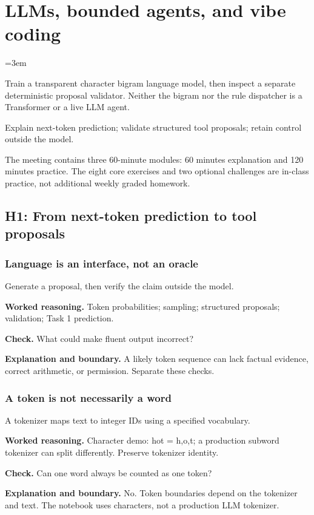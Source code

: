 \chapter{LLMs, bounded agents, and vibe coding}\label{chap:w12-studio}\label{chap:llm}
\emergencystretch=3em

Train a transparent character bigram language model, then inspect a separate deterministic proposal validator. Neither the bigram nor the rule dispatcher is a Transformer or a live LLM agent.
\begin{learningbox}Explain next-token prediction; validate structured tool proposals; retain control outside the model.\end{learningbox}
The meeting contains three 60-minute modules: 60 minutes explanation and 120 minutes practice. The eight core exercises and two optional challenges are in-class practice, not additional weekly graded homework.
\section{H1: From next-token prediction to tool proposals}
\subsection{Language is an interface, not an oracle}
Generate a proposal, then verify the claim outside the model.

\textbf{Worked reasoning.} Token probabilities; sampling; structured proposals; validation; Task 1 prediction.

\textbf{Check.} What could make fluent output incorrect?

\textbf{Explanation and boundary.} A likely token sequence can lack factual evidence, correct arithmetic, or permission. Separate these checks.

\subsection{A token is not necessarily a word}
A tokenizer maps text to integer IDs using a specified vocabulary.

\textbf{Worked reasoning.} Character demo: hot = h,o,t; a production subword tokenizer can split differently. Preserve tokenizer identity.

\textbf{Check.} Can one word always be counted as one token?

\textbf{Explanation and boundary.} No. Token boundaries depend on the tokenizer and text. The notebook uses characters, not a production LLM tokenizer.

